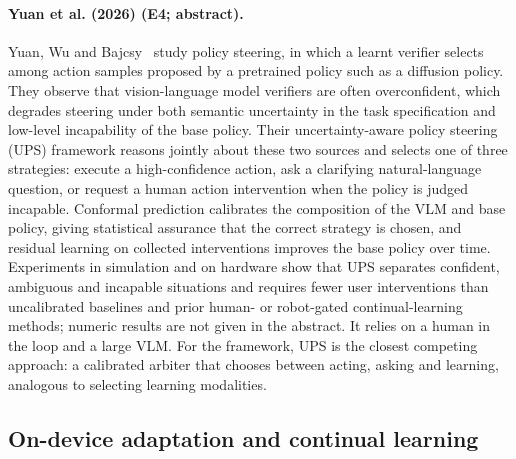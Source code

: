 \documentclass[10pt,a4paper]{article}
\begin{document}
\paragraph{Yuan et al. (2026) (E4; abstract).} Yuan, Wu and Bajcsy~\cite{Yuan2026} study policy steering, in which a learnt verifier selects among action samples proposed by a pretrained policy such as a diffusion policy. They observe that vision-language model verifiers are often overconfident, which degrades steering under both semantic uncertainty in the task specification and low-level incapability of the base policy. Their uncertainty-aware policy steering (UPS) framework reasons jointly about these two sources and selects one of three strategies: execute a high-confidence action, ask a clarifying natural-language question, or request a human action intervention when the policy is judged incapable. Conformal prediction calibrates the composition of the VLM and base policy, giving statistical assurance that the correct strategy is chosen, and residual learning on collected interventions improves the base policy over time. Experiments in simulation and on hardware show that UPS separates confident, ambiguous and incapable situations and requires fewer user interventions than uncalibrated baselines and prior human- or robot-gated continual-learning methods; numeric results are not given in the abstract. It relies on a human in the loop and a large VLM. For the framework, UPS is the closest competing approach: a calibrated arbiter that chooses between acting, asking and learning, analogous to selecting learning modalities.

\subsection*{On-device adaptation and continual learning}
\end{document}
